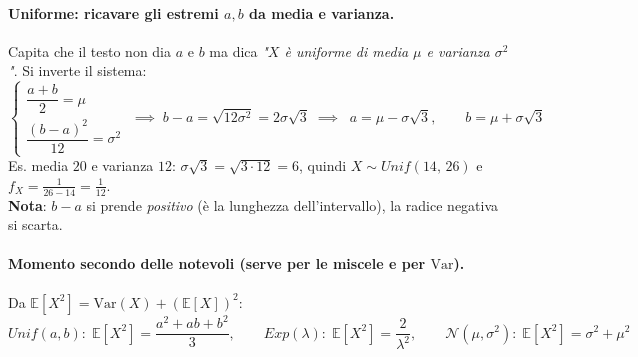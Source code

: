 \documentclass[12pt]{extarticle} %
\begin{document}
\paragraph{Uniforme: ricavare gli estremi $a, b$ da media e varianza.} Capita che il testo non dia $a$ e $b$ ma dica \emph{"$X$ è uniforme di media $\mu$ e varianza $\sigma^2$"}. Si inverte il sistema:
$$ \begin{cases} \dfrac{a+b}{2} = \mu \\[4pt] \dfrac{(b-a)^2}{12} = \sigma^2 \end{cases} \;\implies\; b - a = \sqrt{12\sigma^2} = 2\sigma\sqrt3 \;\implies\; \boxed{\;a = \mu - \sigma\sqrt3, \qquad b = \mu + \sigma\sqrt3\;} $$
{\footnotesize Es. media $20$ e varianza $12$: $\sigma\sqrt3 = \sqrt{3\cdot 12} = 6$, quindi $X \sim Unif(14,\,26)$ e $f_X = \frac{1}{26-14} = \frac{1}{12}$. \\ \textbf{Nota}: $b-a$ si prende \emph{positivo} (è la lunghezza dell'intervallo), la radice negativa si scarta.}

\paragraph{Momento secondo delle notevoli (serve per le miscele e per $\mathrm{Var}$).} Da $\mathbb{E}[X^2] = \mathrm{Var}(X) + (\mathbb{E}[X])^2$:
$$ Unif(a,b):\; \mathbb{E}[X^2] = \frac{a^2+ab+b^2}{3}, \qquad Exp(\lambda):\; \mathbb{E}[X^2] = \frac{2}{\lambda^2}, \qquad \mathcal{N}(\mu,\sigma^2):\; \mathbb{E}[X^2] = \sigma^2 + \mu^2 $$
\end{document}
